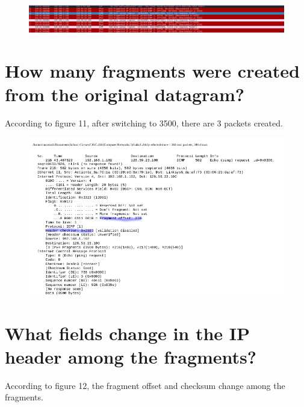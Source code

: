 \documentclass{article}
\begin{document}
\begin{figure}[h!]
\centering
\includegraphics[scale=0.5]{Q14.png}
\caption{}
\end{figure}

\section*{How many fragments were created from the original datagram?}
According to figure 11, after switching to 3500, there are 3 packets created.\\
\clearpage

\begin{figure}[h!]
\centering
\includegraphics[scale=0.5]{Q15.pdf}
\caption{}
\end{figure}

\section*{What fields change in the IP header among the fragments?}
According to figure 12, the fragment offset and checksum change among the fragments.
\end{document}
